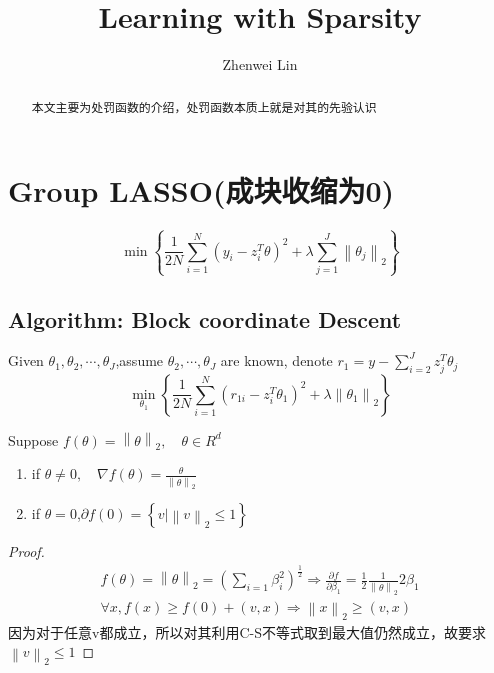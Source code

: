 \documentclass[lang=cn,11pt,a4paper]{elegantpaper}
\title{Learning with Sparsity}
\author{Zhenwei Lin }
\date{\zhtoday}
\theoremstyle{plain}
\theoremstyle{remark}
\begin{document}
\maketitle

\begin{abstract}
本文主要为处罚函数的介绍，处罚函数本质上就是对其的先验认识
\keywords{}
\end{abstract}


\section{Group LASSO(成块收缩为0)}
\begin{equation*}
    \min \left\{ \frac{1}{2N}\sum_{i=1}^{N}(y_i-z_i^T\theta)^2+\lambda \sum_{j=1}^{J} \left\| \theta_j \right\| _2 \right\} 
\end{equation*}

\subsection{Algorithm: Block coordinate Descent}

Given $\theta_1,\theta_2,\cdots,\theta_J$,assume $\theta_2,\cdots,\theta_J$ are known, denote $r_1 = y - \sum_{i=2}^{J}z_j^T\theta_j$  
\begin{equation*}
    \min_{\theta_1} \left\{ \frac{1}{2N} \sum_{i=1}^{N} (r_{1i} - z_i^T\theta _1)^2+\lambda \left\| \theta_1 \right\|_2 \right\} 
\end{equation*}

\begin{lemma}
    Suppose $f(\theta) = \left\| \theta \right\|_2 ,\quad \theta \in R^d $ 
    \begin{enumerate}
        \setlength\itemindent{25pt} \item if $\theta \ne 0, \quad \nabla {f(\theta)} = \frac{\theta}{\left\| \theta \right\|_2 }$ 
        \setlength\itemindent{25pt} \item if $\theta = 0$,$\partial f(0) = \left\{ v|\left\| v \right\| _2 \leq 1 \right\} $  
    \end{enumerate}
\end{lemma}

\begin{proof}
    \begin{equation*}
        \begin{aligned}
            f(\theta) = \left\| \theta \right\|_2 = (\sum_{i=1}\beta_i^2)^{\frac{1}{2}} 
            \Rightarrow \frac{\partial f}{\partial \beta_1} = \frac{1}{2} \frac{1}{\left\| \theta \right\|_2 }2\beta_1\\
            \forall x,f(x) \geq f(0)+(v,x)\Rightarrow \left\| x \right\| _2 \geq (v,x)
        \end{aligned}
    \end{equation*}
    因为对于任意v都成立，所以对其利用C-S不等式取到最大值仍然成立，故要求 $\left\| v \right\| _2 \leq 1$ 
\end{proof}
\end{document}
